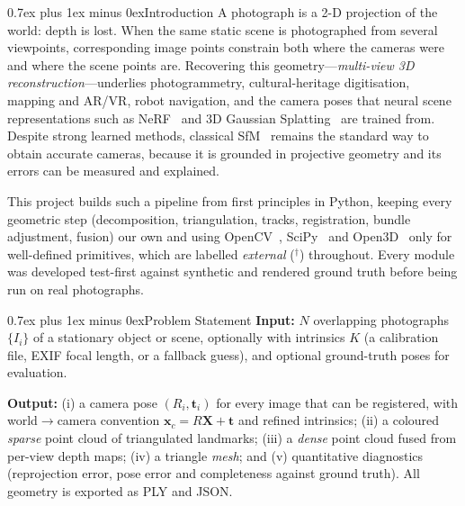 \documentclass[conference,11pt]{IEEEtran}
\makeatletter
\newcommand{\ext}{$^{\dagger}$}
\def\section{\@startsection{section}{1}{\z@}{1.5ex plus 1.5ex minus 0.5ex}%
{0.7ex plus 1ex minus 0ex}{\normalfont\large\bfseries\centering\scshape}}
\makeatother
\begin{document}
\section{Introduction}
A photograph is a 2-D projection of the world: depth is lost. When the same static scene is photographed from several viewpoints, corresponding image points constrain both where the cameras were and where the scene points are. Recovering this geometry---\emph{multi-view 3D reconstruction}---underlies photogrammetry, cultural-heritage digitisation, mapping and AR/VR, robot navigation, and the camera poses that neural scene representations such as NeRF~\cite{mildenhall2020nerf} and 3D Gaussian Splatting~\cite{kerbl2023gaussian} are trained from. Despite strong learned methods, classical SfM~\cite{hartley2004multiple,schoenberger2016sfm} remains the standard way to obtain accurate cameras, because it is grounded in projective geometry and its errors can be measured and explained.

This project builds such a pipeline from first principles in Python, keeping every geometric step (decomposition, triangulation, tracks, registration, bundle adjustment, fusion) our own and using OpenCV~\cite{bradski2000opencv}, SciPy~\cite{virtanen2020scipy} and Open3D~\cite{zhou2018open3d} only for well-defined primitives, which are labelled \emph{external} (\ext) throughout. Every module was developed test-first against synthetic and rendered ground truth before being run on real photographs.

\section{Problem Statement}
\textbf{Input:} $N$ overlapping photographs $\{I_i\}$ of a stationary object or scene, optionally with intrinsics $K$ (a calibration file, EXIF focal length, or a fallback guess), and optional ground-truth poses for evaluation.

\textbf{Output:} (i) a camera pose $(R_i, \mathbf{t}_i)$ for every image that can be registered, with world$\rightarrow$camera convention $\mathbf{x}_c = R\mathbf{X} + \mathbf{t}$ and refined intrinsics; (ii) a coloured \emph{sparse} point cloud of triangulated landmarks; (iii) a \emph{dense} point cloud fused from per-view depth maps; (iv) a triangle \emph{mesh}; and (v) quantitative diagnostics (reprojection error, pose error and completeness against ground truth). All geometry is exported as PLY and JSON.
\end{document}
